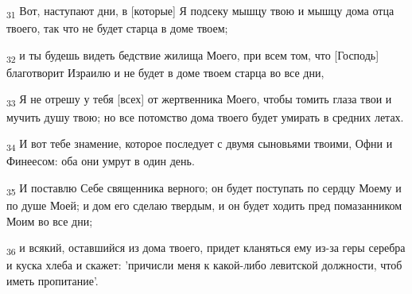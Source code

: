 \begin{tcolorbox}
\textsubscript{31} Вот, наступают дни, в [которые] Я подсеку мышцу твою и мышцу дома отца твоего, так что не будет старца в доме твоем;
\end{tcolorbox}
\begin{tcolorbox}
\textsubscript{32} и ты будешь видеть бедствие жилища Моего, при всем том, что [Господь] благотворит Израилю и не будет в доме твоем старца во все дни,
\end{tcolorbox}
\begin{tcolorbox}
\textsubscript{33} Я не отрешу у тебя [всех] от жертвенника Моего, чтобы томить глаза твои и мучить душу твою; но все потомство дома твоего будет умирать в средних летах.
\end{tcolorbox}
\begin{tcolorbox}
\textsubscript{34} И вот тебе знамение, которое последует с двумя сыновьями твоими, Офни и Финеесом: оба они умрут в один день.
\end{tcolorbox}
\begin{tcolorbox}
\textsubscript{35} И поставлю Себе священника верного; он будет поступать по сердцу Моему и по душе Моей; и дом его сделаю твердым, и он будет ходить пред помазанником Моим во все дни;
\end{tcolorbox}
\begin{tcolorbox}
\textsubscript{36} и всякий, оставшийся из дома твоего, придет кланяться ему из-за геры серебра и куска хлеба и скажет: 'причисли меня к какой-либо левитской должности, чтоб иметь пропитание'.
\end{tcolorbox}
